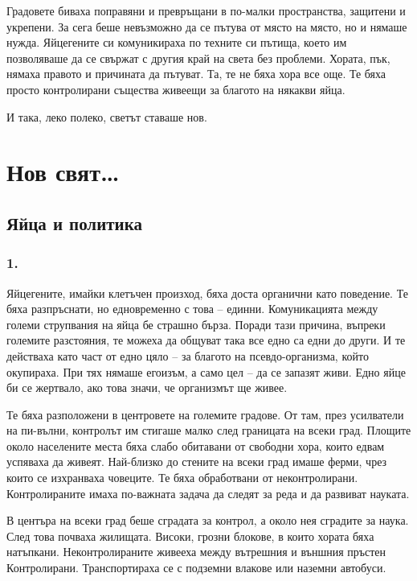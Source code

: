 \documentclass[ebook,openany,12pt]{memoir}
\begin{document}
Градовете биваха поправяни и превръщани в по-мал\-ки пространства, защитени и укрепени. За сега беше невъзможно да се пътува от място на място, но и нямаше нужда. Яйцегените си комуникираха по техните си пътища, което им позволяваше да се свържат с другия край на света без проблеми. Хората, пък, нямаха правото и причината да пътуват. Та, те не бяха хора все още. Те бяха просто контролирани същества живеещи за благото на някакви яйца.

И така, леко полеко, светът ставаше нов.

\part{Нов свят\ldots}

\chapter{Яйца и политика}

\section*{1.}

Яйцегените, имайки клетъчен произход, бяха доста органични като поведение. Те бяха разпръснати, но едновременно с това – единни. Комуникацията между големи струпвания на яйца бе страшно бърза. Поради тази причина, въпреки големите разстояния, те можеха да общуват така все едно са едни до други. И те действаха като част от едно цяло – за благото на псевдо-организма, който окупираха. При тях нямаше егоизъм, а само цел – да се запазят живи. Едно яйце би се жертвало, ако това значи, че организмът ще живее.

Те бяха разположени в центровете на големите градове. От там, през усилватели на пи-вълни, контролът им стигаше малко след границата на всеки град. Площите около населените места бяха слабо обитавани от свободни хора, които едвам успяваха да живеят. Най-близко до стените на всеки град имаше ферми, чрез които се изхранваха човеците. Те бяха обработвани от неконтролирани. Контролираните имаха по-важната задача да следят за реда и да развиват науката.

В центъра на всеки град беше сградата за контрол, а около нея сградите за наука. След това почваха жилищата. Високи, грозни блокове, в които хората бяха натъпкани. Неконтролираните живееха между вътрешния и външния пръстен Контролирани. Транспортираха се с подземни влакове или наземни автобуси.
\end{document}
